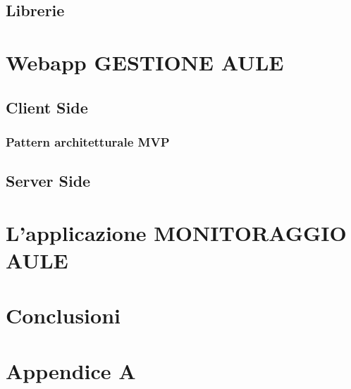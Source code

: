 \documentclass[a4paper,pt11,oneside]{book}
\begin{document}
\section{Librerie}


\chapter{Webapp GESTIONE AULE}


\section{Client Side}

\subsection{Pattern architetturale MVP}




\section{Server Side}


\chapter{L'applicazione MONITORAGGIO AULE}


\chapter{Conclusioni}


\chapter{Appendice A}



\end{document}
